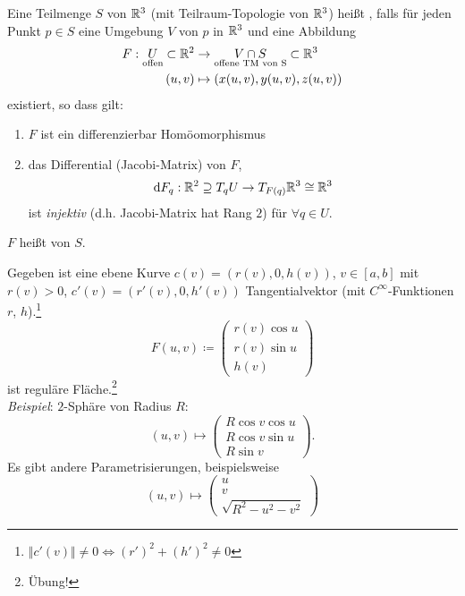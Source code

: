 \begin{definition}
  Eine Teilmenge $ S $ von $ \mathbb{R}^3 $ (mit Teilraum-Topologie von $ \mathbb{R}^3 $) heißt \label{def:regulaereFlaeche}, falls für jeden Punkt $ p \in S $ eine Umgebung $ V $ von $ p $ in $ \mathbb{R}^3 $ und eine Abbildung
  \begin{align*}
    F : \underset{\text{offen}}{U} \subset \mathbb{R}^2 &\to \underset{\text{offene TM von S}}{V \cap S} \subset \mathbb{R}^3 \\
      (u,v) &\mapsto (x(u,v),y(u,v),z(u,v))
  \end{align*}
  existiert, so dass gilt:
  \begin{enumerate}
    \item $ F $ ist ein differenzierbar Homöomorphismus
    \item das Differential (Jacobi-Matrix) von $ F $,
    \begin{equation*}
       \text{d}F_q : \mathbb{R}^2 \supseteq T_qU \to T_{F(q)}\mathbb{R}^3 \cong \mathbb{R}^3
     \end{equation*} 
     ist \emph{injektiv} (d.h. Jacobi-Matrix hat Rang $ 2 $) für $ \forall q \in U $.
  \end{enumerate}
  $ F $ heißt \label{def:lokaleParametrisierung} von $ S $.
\end{definition}

\begin{example}[Rotationsfläche]
  Gegeben ist eine ebene Kurve $ c(v) = \left( r(v), 0, h(v) \right) $, $ v \in [a,b] $ mit $ r(v) > 0 $, $ c'(v) = \left( r'(v), 0, h'(v) \right) $ Tangentialvektor (mit $ C^\infty $-Funktionen $ r $, $ h $).\footnote{$ \Vert c'(v) \Vert \neq 0 \Leftrightarrow (r')^2 + (h')^2 \neq 0 $}
  \begin{equation*}
    F(u,v) \coloneqq \begin{pmatrix}
      r(v)\cos u \\
      r(v)\sin u \\
      h(v)
    \end{pmatrix}
  \end{equation*}
  ist reguläre Fläche.\footnote{Übung!} \\
  \emph{Beispiel}: $ 2 $-Sphäre von Radius $ R $:
  \begin{equation*}
    (u,v) \mapsto \begin{pmatrix}
      R\cos v \cos u \\
      R\cos v\sin u \\
      R\sin v
    \end{pmatrix}\text{.}
  \end{equation*}
  Es gibt andere Parametrisierungen, beispielsweise
  \begin{equation*}
    (u,v) \mapsto \begin{pmatrix}
      u \\ v \\ \sqrt{R^2-u^2-v^2}
    \end{pmatrix}
  \end{equation*}
\end{example}

